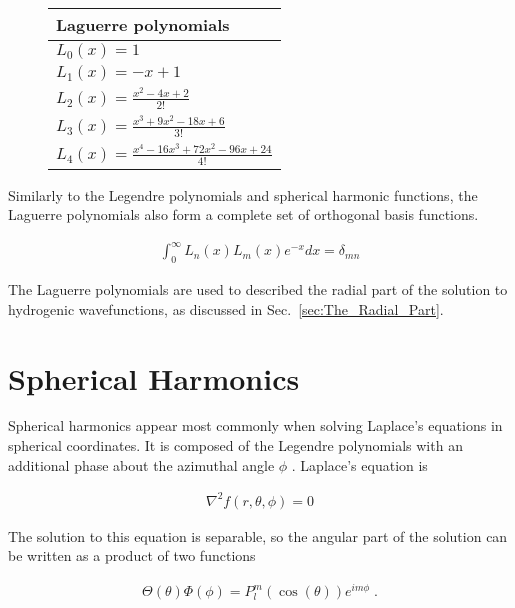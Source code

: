         \begin{figure}
            \centering 
            \begin{tabular}{l}
                Laguerre polynomials\\
                \hline 
                $L_0(x) = 1$\\
                $L_1(x) = -x + 1$\\
                $L_2(x) = \frac{x^2 - 4x + 2}{2!}$\\
                $L_3(x) = \frac{x^3 + 9x^2 - 18x + 6}{3!}$\\
                $L_4(x) = \frac{x^4 - 16x^3 + 72x^2 - 96x + 24}{4!}$\\
                \hline
            \end{tabular}
        \end{figure}

        \noindent Similarly to the Legendre polynomials and spherical harmonic functions, the Laguerre polynomials also form a complete set of orthogonal basis functions.

        \begin{align}
            \int_0^\infty L_n(x) L_m(x) e^{-x} dx = \delta_{m n}
        \end{align}

        \noindent The Laguerre polynomials are used to described the radial part of the solution to hydrogenic wavefunctions, as discussed in Sec.~\ref{sec:The_Radial_Part}. 
        \section{Spherical Harmonics} \label{sec:Spherical_Harmonics}
        Spherical harmonics appear most commonly when solving Laplace's equations in spherical coordinates. It is composed of the Legendre polynomials with an additional phase about the azimuthal angle $\phi$ \cite{Riley_Hobson_Bence_2006}. Laplace's equation is 

        \begin{align}
            \nabla^2 f(r, \theta, \phi) = 0
        \end{align}

        \noindent The solution to this equation is separable, so the angular part of the solution can be written as a product of two functions 

        \begin{align}
            \Theta (\theta) \Phi(\phi) = P^m_l(\cos(\theta)) e^{im\phi}\;.
        \end{align}


